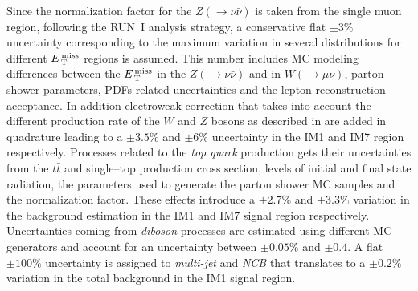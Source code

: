 Since the normalization factor for the $Z(\rightarrow \nu \bar{\nu})$ is taken
from the single muon region, following the RUN~I analysis
strategy\cite{RunIPaper}, a conservative flat $\pm 3\%$ uncertainty
corresponding to the maximum variation in several distributions for different
$E_\mathrm{\, T}^\mathrm{\, miss}$ regions is assumed. This number includes MC modeling differences between
the $E_\mathrm{\, T}^\mathrm{\, miss}$ in the $Z(\rightarrow \nu \bar{\nu})$ and in
$W(\rightarrow \mu \nu)$, parton shower parameters, PDFs related uncertainties
and the lepton reconstruction acceptance. In addition electroweak correction
that takes into account the different production rate of the $W$ and $Z$ bosons
as described in\cite{EWCorrections} are added in quadrature leading to a
$\pm 3.5\%$ and $\pm 6\%$ uncertainty in the IM1 and IM7 region
respectively. Processes related to the \emph{top quark} production gets their
uncertainties from the $t \bar{t}$ and single--top production cross section,
levels of initial and final state radiation, the parameters used to generate the
parton shower MC samples and the normalization factor. These effects introduce a
$\pm 2.7\%$ and $\pm 3.3 \%$ variation in the background estimation in the IM1
and IM7 signal region respectively. Uncertainties coming from \emph{diboson}
processes are estimated using different MC generators and account for an
uncertainty between $\pm 0.05\%$ and $\pm 0.4$. A flat $\pm 100\%$ uncertainty
is assigned to \emph{multi-jet} and \emph{NCB} that translates to a $\pm 0.2\%$
variation in the total background in the IM1 signal region.
